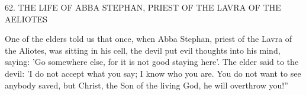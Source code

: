 62. THE LIFE OF ABBA STEPHAN, PRIEST OF
THE LAVRA OF THE AELIOTES

One of the elders told us that once, when Abba Stephan, priest of
the Lavra of the Aliotes, was sitting in his cell, the devil put evil
thoughts into his mind, saying: 'Go somewhere else, for it is not
good staying here'. The elder said to the devil: 'I do not accept what
you say; I know who you are. You do not want to see anybody
saved, but Christ, the Son of the living God, he will overthrow you!”

